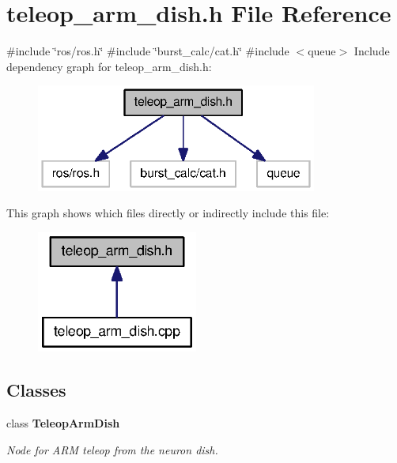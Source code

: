 \section{teleop\-\_\-arm\-\_\-dish.\-h \-File \-Reference}
\label{teleop__arm__dish_8h}
{\ttfamily \#include \char`\"{}ros/ros.\-h\char`\"{}}\*
{\ttfamily \#include \char`\"{}burst\-\_\-calc/cat.\-h\char`\"{}}\*
{\ttfamily \#include $<$queue$>$}\*
\-Include dependency graph for teleop\-\_\-arm\-\_\-dish.\-h\-:\nopagebreak
\begin{figure}[H]
\begin{center}
\leavevmode
\includegraphics[width=262pt]{teleop__arm__dish_8h__incl}
\end{center}
\end{figure}
\-This graph shows which files directly or indirectly include this file\-:\nopagebreak
\begin{figure}[H]
\begin{center}
\leavevmode
\includegraphics[width=150pt]{teleop__arm__dish_8h__dep__incl}
\end{center}
\end{figure}
\subsection*{\-Classes}
\begin{DoxyCompactItemize}
\item 
class {\bf \-Teleop\-Arm\-Dish}
\begin{DoxyCompactList}\small\item\em \-Node for \-A\-R\-M teleop from the neuron dish. \end{DoxyCompactList}\end{DoxyCompactItemize}
